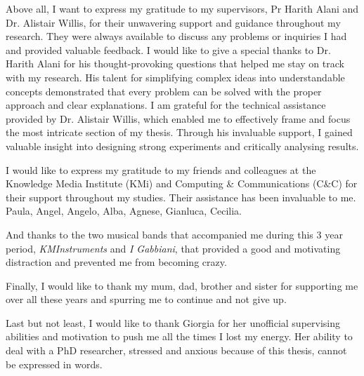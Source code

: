 Above all, I want to express my gratitude to my supervisors, Pr Harith Alani and Dr. Alistair Willis, for their unwavering support and guidance throughout my research. They were always available to discuss any problems or inquiries I had and provided valuable feedback.
I would like to give a special thanks to Dr. Harith Alani for his thought-provoking questions that helped me stay on track with my research. His talent for simplifying complex ideas into understandable concepts demonstrated that every problem can be solved with the proper approach and clear explanations.
I am grateful for the technical assistance provided by Dr. Alistair Willis, which enabled me to effectively frame and focus the most intricate section of my thesis. Through his invaluable support, I gained valuable insight into designing strong experiments and critically analysing results.


I would like to express my gratitude to my friends and colleagues at the Knowledge Media Institute (KMi) and Computing \& Communications (C\&C) for their support throughout my studies. Their assistance has been invaluable to me. Paula, Angel, Angelo, Alba, Agnese, Gianluca, Cecilia.

And thanks to the two musical bands that accompanied me during this 3 year period, \emph{KMInstruments} and \emph{I Gabbiani}, that provided a good and motivating distraction and prevented me from becoming crazy. 

Finally, I would like to thank my mum, dad, brother and sister for supporting me over all these years and spurring me to continue and not give up.

Last but not least, I would like to thank Giorgia for her unofficial supervising abilities and motivation to push me all the times I lost my energy. Her ability to deal with a PhD researcher, stressed and anxious because of this thesis, cannot be expressed in words.
